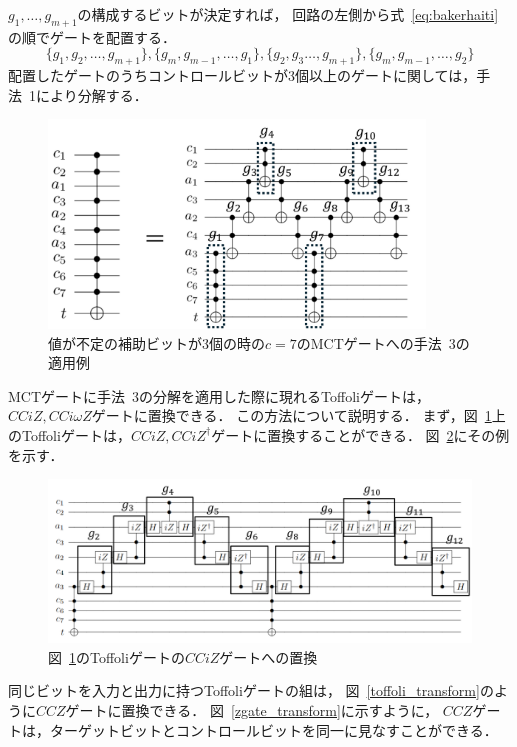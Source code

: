 $g_{1},\dots ,g_{m+1}$の構成するビットが決定すれば，
回路の左側から式~\ref{eq:bakerhaiti}の順でゲートを配置する．
\begin{equation}\label{eq:bakerhaiti}
  \{g_{1}, g_{2}, \dots, g_{m+1}\},\{g_{m},g_{m-1}, \dots, g_{1}\}, \{g_{2}, g_{3} \dots, g_{m+1}\}, \{g_{m}, g_{m-1}, \dots, g_{2}\}
\end{equation}
配置したゲートのうちコントロールビットが3個以上のゲートに関しては，手法~1により分解する．
\begin{figure}[tbp]
  \centering
  \includegraphics[width=10cm]{img/baker.pdf}
  \caption{値が不定の補助ビットが3個の時の$c=7$のMCTゲートへの手法~3の適用例}
  \label{baker}
\end{figure}
\par
MCTゲートに手法~3の分解を適用した際に現れるToffoliゲートは，$CCiZ, CCi\omega Z$ゲートに置換できる．
この方法について説明する．
まず，図~\ref{baker}上のToffoliゲートは，$CCiZ, CCiZ^{\dag}$ゲートに置換することができる．
図~\ref{baker_cciz}にその例を示す．
\begin{figure}[tbp]
  \centering
  \includegraphics[width=15cm]{img/baker_izgate_transform.pdf}
  \caption{図~\ref{baker}のToffoliゲートの$CCiZ$ゲートへの置換}
  \label{baker_cciz}
\end{figure}
同じビットを入力と出力に持つToffoliゲートの組は，
図~\ref{toffoli_transform}のように$CCZ$ゲートに置換できる．
図~\ref{zgate_transform}に示すように，
$CCZ$ゲートは，ターゲットビットとコントロールビットを同一に見なすことができる．
